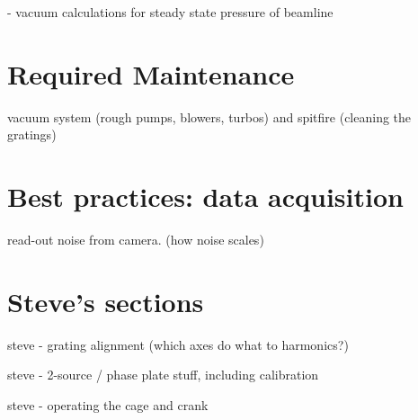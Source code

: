 - vacuum calculations for steady state pressure of beamline

\section{Required Maintenance}

vacuum system (rough pumps, blowers, turbos) and spitfire (cleaning the gratings)

\section{Best practices: data acquisition}

read-out noise from camera. (how noise scales)

\section{Steve's sections}
steve - grating alignment (which axes do what to harmonics?)

steve - 2-source / phase plate stuff, including calibration

steve - operating the cage and crank